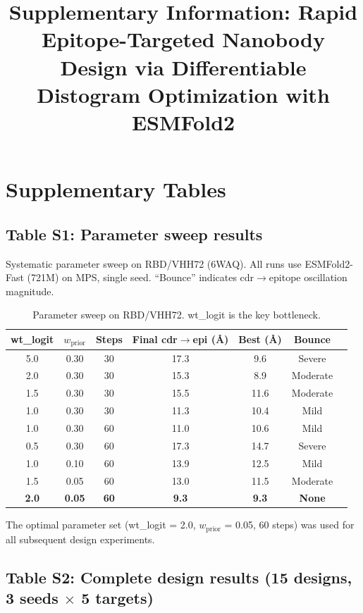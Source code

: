 \documentclass{nature}
\begin{document}
\title{Supplementary Information: Rapid Epitope-Targeted Nanobody Design via Differentiable Distogram Optimization with ESMFold2}

\maketitle

\section{Supplementary Tables}

\subsection{Table S1: Parameter sweep results}

Systematic parameter sweep on RBD/VHH72 (6WAQ). All runs use ESMFold2-Fast (721M) on MPS, single seed. ``Bounce'' indicates cdr$\to$epitope oscillation magnitude.

\begin{table}[htbp]
\centering
\caption{Parameter sweep on RBD/VHH72. wt\_logit is the key bottleneck.}
\begin{tabular}{ccccccc}
\toprule
wt\_logit & $w_\text{prior}$ & Steps & Final cdr$\to$epi (\AA) & Best (\AA) & Bounce \\
\midrule
5.0 & 0.30 & 30 & 17.3 & 9.6  & Severe \\
2.0 & 0.30 & 30 & 15.3 & 8.9  & Moderate \\
1.5 & 0.30 & 30 & 15.5 & 11.6 & Moderate \\
1.0 & 0.30 & 30 & 11.3 & 10.4 & Mild \\
1.0 & 0.30 & 60 & 11.0 & 10.6 & Mild \\
0.5 & 0.30 & 60 & 17.3 & 14.7 & Severe \\
1.0 & 0.10 & 60 & 13.9 & 12.5 & Mild \\
1.5 & 0.05 & 60 & 13.0 & 11.5 & Moderate \\
\textbf{2.0} & \textbf{0.05} & \textbf{60} & \textbf{9.3} & \textbf{9.3} & \textbf{None} \\
\bottomrule
\end{tabular}
\end{table}

The optimal parameter set (wt\_logit = 2.0, $w_\text{prior}$ = 0.05, 60 steps) was used for all subsequent design experiments.

\subsection{Table S2: Complete design results (15 designs, 3 seeds $\times$ 5 targets)}
\end{document}
